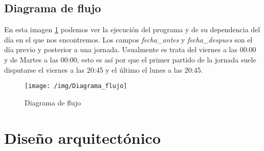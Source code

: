 \subsection{Diagrama de flujo}
En esta imagen \ref{fig:DiagFluj} podemos ver la ejecución del programa y de su dependencia del día en el que nos encontremos. Los campos \textit{fecha_antes} y \textit{fecha_despues} son el día previo y posterior a una jornada. Usualmente es trata del viernes a las 00:00 y  de Martes a las 00:00, esto es así por que el primer partido de la jornada suele disputarse el viernes a las 20:45 y el último el lunes a las 20:45.
\begin{figure}
\centering
\texttt{[image: /img/Diagrama\_flujo]}
\caption{Diagrama de flujo}
\label{fig:DiagFluj}
\end{figure}

\section{Diseño arquitectónico}


